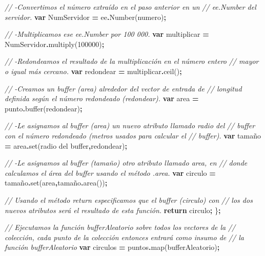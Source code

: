 \documentclass[
  12pt,
  letterpaper,
  twoside]{book}
\newenvironment{Shaded}{\begin{snugshade}}{\end{snugshade}}
\newcommand{\CommentTok}[1]{\textcolor[rgb]{0.56,0.35,0.01}{\textit{#1}}}
\newcommand{\ControlFlowTok}[1]{\textcolor[rgb]{0.13,0.29,0.53}{\textbf{#1}}}
\newcommand{\DecValTok}[1]{\textcolor[rgb]{0.00,0.00,0.81}{#1}}
\newcommand{\FunctionTok}[1]{\textcolor[rgb]{0.00,0.00,0.00}{#1}}
\newcommand{\KeywordTok}[1]{\textcolor[rgb]{0.13,0.29,0.53}{\textbf{#1}}}
\newcommand{\NormalTok}[1]{#1}
\newcommand{\OperatorTok}[1]{\textcolor[rgb]{0.81,0.36,0.00}{\textbf{#1}}}
\newcommand{\StringTok}[1]{\textcolor[rgb]{0.31,0.60,0.02}{#1}}
\begin{document}
\begin{Shaded}
\begin{Highlighting}[]
  \CommentTok{//  {-}Convertimos el número extraído en el paso anterior en un }
  \CommentTok{// \textasciigrave{}ee.Number\textasciigrave{} del servidor.}
    \KeywordTok{var}\NormalTok{ NumServidor }\OperatorTok{=}\NormalTok{ ee}\OperatorTok{.}\FunctionTok{Number}\NormalTok{(numero)}\OperatorTok{;}   

  \CommentTok{//  {-}Multiplicamos ese \textasciigrave{}ee.Number\textasciigrave{} por 100 000.}
  \KeywordTok{var}\NormalTok{ multiplicar }\OperatorTok{=}\NormalTok{ NumServidor}\OperatorTok{.}\FunctionTok{multiply}\NormalTok{(}\DecValTok{100000}\NormalTok{)}\OperatorTok{;} 
 
  \CommentTok{//  {-}Redondeamos el resultado de la multiplicación en el número entero }
  \CommentTok{//  mayor o igual más cercano.}
  \KeywordTok{var}\NormalTok{ redondear }\OperatorTok{=}\NormalTok{ multiplicar}\OperatorTok{.}\FunctionTok{ceil}\NormalTok{()}\OperatorTok{;} 
  
  \CommentTok{//  {-}Creamos un buffer (area) alrededor del vector de entrada de }
  \CommentTok{// longitud definida según el número redondeado (redondear).}
  \KeywordTok{var}\NormalTok{ area }\OperatorTok{=}\NormalTok{ punto}\OperatorTok{.}\FunctionTok{buffer}\NormalTok{(redondear)}\OperatorTok{;}

  \CommentTok{//  {-}Le asignamos al buffer (area) un nuevo atributo llamado \textquotesingle{}radio del}
  \CommentTok{//  buffer\textquotesingle{} con el número redondeado (metros usados para calcular el }
  \CommentTok{// buffer).}
  \KeywordTok{var}\NormalTok{ tamaño }\OperatorTok{=}\NormalTok{ area}\OperatorTok{.}\FunctionTok{set}\NormalTok{(}\StringTok{\textquotesingle{}radio del buffer\textquotesingle{}}\OperatorTok{,}\NormalTok{redondear)}\OperatorTok{;}  

  \CommentTok{//  {-}Le asignamos al buffer (tamaño) otro atributo llamado \textquotesingle{}area\textquotesingle{}, en }
  \CommentTok{// donde calculamos el área del buffer usando el método \textasciigrave{}.area\textasciigrave{}.}
  \KeywordTok{var}\NormalTok{ circulo }\OperatorTok{=}\NormalTok{ tamaño}\OperatorTok{.}\FunctionTok{set}\NormalTok{(}\StringTok{\textquotesingle{}area\textquotesingle{}}\OperatorTok{,}\NormalTok{tamaño}\OperatorTok{.}\FunctionTok{area}\NormalTok{())}\OperatorTok{;}  

  \CommentTok{//  Usando el método return especificamos que el buffer (circulo) con }
  \CommentTok{// los dos nuevos atributos será el resultado de esta función. }
  \ControlFlowTok{return}\NormalTok{ circulo}\OperatorTok{;}
\NormalTok{\}}\OperatorTok{;}

\CommentTok{// Ejecutamos la función \textquotesingle{}bufferAleatorio\textquotesingle{} sobre todos los vectores de la}
\CommentTok{// colección, cada punto de la colección entonces entrará como insumo de }
\CommentTok{// la función bufferAleatorio}
\KeywordTok{var}\NormalTok{ circulos }\OperatorTok{=}\NormalTok{ puntos}\OperatorTok{.}\FunctionTok{map}\NormalTok{(bufferAleatorio)}\OperatorTok{;} 
\end{Highlighting}
\end{Shaded}
\end{document}
